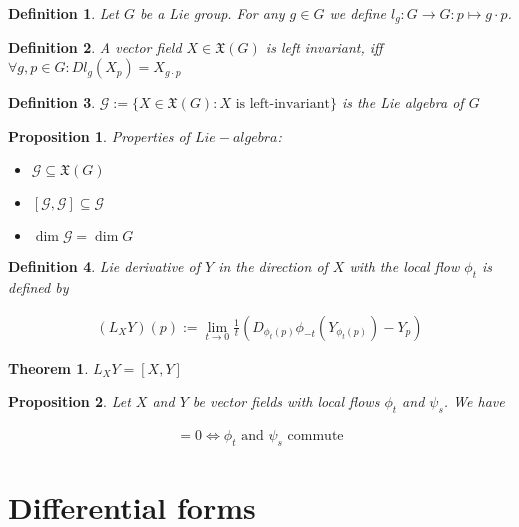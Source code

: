 \documentclass{scrartcl}
\newtheorem*{mydef}{Definition}
\newtheorem*{prop}{Proposition}
\newtheorem*{thm}{Theorem}
\begin{document}
\begin{mydef}
  Let $G$ be a Lie group. For any $g\in G$ we define $l_g:G\rightarrow G: p \mapsto g\cdot p$.
\end{mydef}

\begin{mydef}
  A vector field $X\in \mathfrak X(G)$ is left invariant, iff $\forall g,p\in G: D l_g(X_p) = X_{g\cdot p}$
\end{mydef}

\begin{mydef}
  $\mathcal G := \{ X\in \mathfrak X(G): X \text{ is left-invariant}\}$ is the \emph{Lie algebra of $G$}
\end{mydef}

\begin{prop}
  Properties of $Lie-algebra$:

  \begin{itemize}
  \item $\mathcal G \subseteq \mathfrak X(G)$
  \item $[\mathcal G,\mathcal G] \subseteq \mathcal G$
  \item $\operatorname{dim} \mathcal G = \operatorname{dim} G$
  \end{itemize}
\end{prop}

\begin{mydef}
  \emph{Lie derivative} of $Y$ in the direction of $X$ with the local flow $\phi_t$ is defined by

  \begin{align}
    (L_X Y)(p) := \lim_{t\rightarrow0} \tfrac 1t (D_{\phi_t(p)}\phi_{-t}(Y_{\phi_t(p)})-Y_p)
  \end{align}
\end{mydef}

\begin{thm}
  $L_X Y = [X,Y]$
\end{thm}

\begin{prop}
  Let $X$ and $Y$ be vector fields with local flows $\phi_t$ and $\psi_s$. We have

  \begin{align}
    [X,Y]=0 \Leftrightarrow \phi_t \text{ and } \psi_s \text{ commute}
  \end{align}
\end{prop}

\section{Differential forms}
\end{document}
